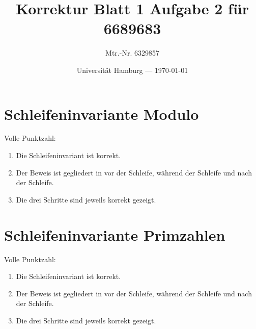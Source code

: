 \documentclass[parskip=half,a4paper]{scrartcl}
\title{Korrektur Blatt 1 Aufgabe 2 für 6689683}
\author{Mtr.-Nr. 6329857}
\date{Universität Hamburg --- \today}
\begin{document}
\maketitle


\section*{Schleifeninvariante Modulo}

Volle Punktzahl:

\begin{enumerate}
    \item Die Schleifeninvariant ist korrekt. \checkmark
    \item Der Beweis ist gegliedert in vor der Schleife, während der Schleife und nach der Schleife. \checkmark
    \item Die drei Schritte sind jeweils korrekt gezeigt.  \checkmark
\end{enumerate}


\section*{Schleifeninvariante Primzahlen}

Volle Punktzahl:

\begin{enumerate}
    \item Die Schleifeninvariant ist korrekt. \checkmark
    \item Der Beweis ist gegliedert in vor der Schleife, während der Schleife und nach der Schleife. \checkmark
    \item Die drei Schritte sind jeweils korrekt gezeigt.  \checkmark
\end{enumerate}
\end{document}
